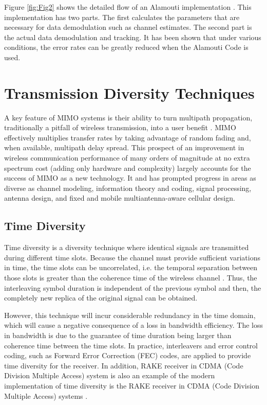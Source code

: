Figure \ref{fig:Fig2} shows the detailed flow of an Alamouti
implementation \cite{21}. This implementation has two parts. The
first calculates the parameters that are necessary for data
demodulation such as channel estimates. The second part is the
actual data demodulation and tracking. It has been shown that under
various conditions, the error rates can be greatly reduced when the
Alamouti Code is used.


\section{Transmission Diversity Techniques}
A key feature of MIMO systems is their ability to turn multipath
propagation, traditionally a pitfall of wireless transmission, into
a user benefit \cite{3}. MIMO effectively multiplies transfer rates
by taking advantage of random fading and, when available, multipath
delay spread. This prospect of an improvement in wireless
communication performance of many orders of magnitude at no extra
spectrum cost (adding only hardware and complexity) largely accounts
for the success of MIMO as a new technology. It  and has prompted
progress in areas as diverse as channel modeling, information theory
and coding, signal processing, antenna design, and fixed and mobile
multiantenna-aware cellular design.

\subsection{Time Diversity}
Time diversity is a diversity technique where identical signals are
transmitted during different time slots. Because the channel must
provide sufficient variations in time, the time slots can be
uncorrelated, i.e. the temporal separation between those slots is
greater than the coherence time of the wireless channel \cite{22}.
Thus, the interleaving symbol duration is independent of the
previous symbol and then, the completely new replica of the original
signal can be obtained.

However, this technique will incur considerable redundancy in the
time domain, which will cause a negative consequence of a loss in
bandwidth efficiency. The loss in bandwidth is due to the guarantee
of time duration being larger than coherence time between the time
slots. In practice, interleavers and error control coding, such as
Forward Error Correction (FEC) codes, are applied to provide time
diversity for the receiver. In addition, RAKE receiver in CDMA (Code
Division Multiple Access) system is also an example of the modern
implementation of time diversity is the RAKE receiver in CDMA (Code
Division Multiple Access) systems \cite{10}.

